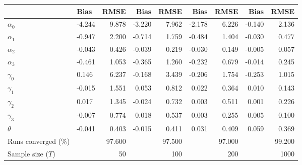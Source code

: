 
\begin{tabular}[t]{llrrrrrrr}
\toprule
  & Bias & RMSE & Bias & RMSE & Bias & RMSE & Bias & RMSE\\
\midrule
$\alpha_{0}$ & -4.244 & 9.878 & -3.220 & 7.962 & -2.178 & 6.226 & -0.140 & 2.136\\
$\alpha_{1}$ & -0.947 & 2.200 & -0.714 & 1.759 & -0.484 & 1.404 & -0.030 & 0.477\\
$\alpha_{2}$ & -0.043 & 0.426 & -0.039 & 0.219 & -0.030 & 0.149 & -0.005 & 0.057\\
$\alpha_{3}$ & -0.461 & 1.053 & -0.365 & 1.260 & -0.232 & 0.679 & -0.014 & 0.245\\
$\gamma_{0}$ & 0.146 & 6.237 & -0.168 & 3.439 & -0.206 & 1.754 & -0.253 & 1.015\\
$\gamma_{1}$ & -0.015 & 1.551 & 0.053 & 0.812 & 0.022 & 0.364 & 0.010 & 0.143\\
$\gamma_{2}$ & 0.017 & 1.345 & -0.024 & 0.732 & 0.003 & 0.511 & 0.001 & 0.226\\
$\gamma_{3}$ & -0.007 & 0.774 & 0.018 & 0.537 & 0.003 & 0.255 & 0.005 & 0.100\\
$\theta$ & -0.041 & 0.403 & -0.015 & 0.411 & 0.031 & 0.409 & 0.059 & 0.369\\
Runs converged (\%) &  & 97.600 &  & 97.500 &  & 97.000 &  & 99.200\\
Sample size ($T$) &  & 50 &  & 100 &  & 200 &  & 1000\\
\bottomrule
\end{tabular}
